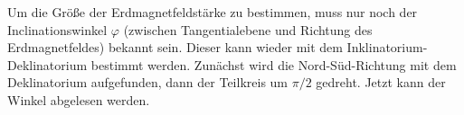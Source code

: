 Um die Größe der Erdmagnetfeldstärke zu bestimmen, muss nur noch der
Inclinationswinkel $\varphi$ (zwischen Tangentialebene und Richtung des
Erdmagnetfeldes) bekannt sein. Dieser kann wieder mit dem
Inklinatorium-Deklinatorium bestimmt werden. Zunächst wird die
Nord-Süd-Richtung mit dem Deklinatorium aufgefunden, dann der Teilkreis
um $\pi/2$ gedreht. Jetzt kann der Winkel abgelesen werden.
